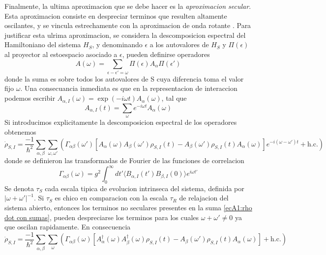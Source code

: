 Finalmente, la ultima aproximacion que se debe hacer es la \textit{aproximacion secular}. Esta aproximacion consiste en despreciar terminos que resulten altamente oscilantes, y se vincula estrechamente con la aproximacion de onda rotante \cite{115}. Para justificar esta ulrima aproximacion, se considera la descomposicion espectral del Hamiltoniano del sistema $H_S$, y denominando $\epsilon$ a los autovalores de $H_S$ y $\Pi(\epsilon)$ al proyector al estoespacio asociado a $\epsilon$, pueden definirse operadores
\begin{equation}
    A(\omega) = \sum_{\epsilon-\epsilon'=\omega}\Pi(\epsilon)A_\alpha\Pi(\epsilon')
\end{equation}
donde la suma es sobre todos los autovalores de S cuya diferencia toma el valor fijo $\omega$. Una consecuancia inmediata es que en la representacion de interaccion podemos escribir $A_{\alpha,I}(\omega)=\exp(-i\omega t)A_\alpha(\omega)$, tal que
\begin{equation}
    A_{\alpha,I}(t)=\sum_\omega e^{-i\omega t}A_{\alpha}(\omega)
\end{equation}
Si introducimos explicitamente la descomposicion espectral de los operadores obtenemos
\begin{equation}
    \dot \rho_{S,I}=\frac{-1}{\hbar^2}\sum_{\alpha,\beta}\sum_{\omega,\omega'} \left( \Gamma_{\alpha\beta}(\omega')[A_\alpha(\omega)A_\beta(\omega')\rho_{S,I}(t)-A_\beta(\omega')\rho_{S,I}(t)A_\alpha(\omega)]e^{-i(\omega-\omega')t}+\text{h.c.} \right)
    \label{ecA1:rho dot con sumas}
\end{equation}
donde se definieron las transformadas de Fourier de las funciones de correlacion
\begin{equation}
    \Gamma_{\alpha\beta}(\omega) = g^2 \int_0^\infty dt' \langle B_{\alpha,I}(t')B_{\beta,I}(0) \rangle e^{i\omega t'}
\end{equation}
Se denota $\tau_S$ cada escala tipica de evolucion intrinseca del sistema, definida por $|\omega+\omega'|^{-1}$. Si $\tau_S$ es chico en comparacion con la escala $\tau_R$ de relajacion del sistema abierto, entonces los terminos no seculares presentes en la suma \ref{ecA1:rho dot con sumas}, pueden despreciarse los terminos para los cuales $\omega+\omega'\neq 0$ ya que oscilan rapidamente. En consecuencia
\begin{equation}
    \dot \rho_{S,I}=\frac{-1}{\hbar^2}\sum_{\alpha,\beta}\sum_{\omega} \left( \Gamma_{\alpha\beta}(\omega)[A^\dagger_\alpha(\omega)A^\dagger_\beta(\omega)\rho_{S,I}(t)-A_\beta(\omega')\rho_{S,I}(t)A_\alpha(\omega)]+\text{h.c.} \right)
    \label{ecA1:rho dot con sumas 2}
\end{equation}
